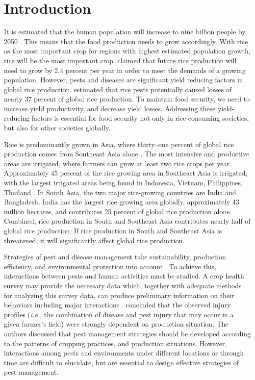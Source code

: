 \section*{Introduction}

It is estimated that the human population will increase to nine billion people by 2050 \cite{2008}. This means that the food production needs to grow accordingly. With rice as the most important crop for regions with highest estimated population growth, rice will be the most important crop. \citet{Ray_2013_Yield} claimed that future rice production will need to grow by 2.4 percent per year in order to meet the demands of a growing population. However, pests and diseases are significant yield reducing factors in global rice production. \citet{Oerke_2005_Crop} estimated that rice pests potentially caused losses of nearly 37 percent of global rice production. To maintain food security, we need to increase yield productivity, and decrease yield losses. Addressing these yield-reducing factors is essential for food security not only in rice consuming societies, but also for other societies globally. 


Rice is predominantly grown in Asia, where thirty–one percent of global rice production comes from Southeast Asia alone \citep{OECD_2012_Agricultural}. The most intensive and productive areas are irrigated, where farmers can grow at least two rice crops per year. Approximately 45 percent of the rice growing area in Southeast Asia is irrigated, with the largest irrigated areas being found in Indonesia, Vietnam, Philippines, Thailand \citep{Mutert_2002_Developments}. In South Asia, the two major rice-growing countries are India and Bangladesh. India has the largest rice growing area globally, approximately 43 million hectares, and contributes 25 percent of global rice production alone. Combined, rice production in South and Southeast Asia contributes nearly half of global rice production. If rice production in South and Southeast Asia is threatened, it will significantly affect global rice production. 

Strategies of pest and disease management take sustainability, production efficiency, and environmental protection into account \citep{Mew_2004_Looking}. To achieve this, interactions between pests and human activities must be studied. A crop health survey may provide the necessary data which, together with adequate methods for analyzing this survey data, can produce preliminary information on their behaviors including major interactions \citep{Savary_1995_Use}. \citet{Savary_2000_Characterization} concluded that the observed injury profiles (\textit{i.e.}, the combination of disease and pest injury that may occur in a given farmer’s field) were strongly dependent on production situation. The authors discussed that pest management strategies should be developed according to the patterns of cropping practices, and production situations. However, interactions among pests and environments under different locations or through time are difficult to elucidate, but are essential to design effective  strategies of pest management. 

